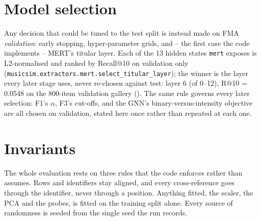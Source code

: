 \section{Model selection}
\label{sec:model-selection-protocol}

Any decision that could be tuned to the test split is instead made on FMA
\emph{validation}: early stopping, hyper-parameter grids, and -- the first
case the code implements -- MERT's titular layer. Each of the 13 hidden
states \texttt{mert} exposes is L2-normalised and ranked by Recall@10 on
validation only (\texttt{musicsim.extractors.mert.select\_titular\_layer});
the winner is the layer every later stage uses, never re-chosen against test:
layer 6 (of 0--12), R@10 = 0.0548 on the 800-item validation gallery
(). The same rule governs every later
selection: F1's $\alpha$, F3's cut-offs, and the GNN's binary-versus-intensity
objective are all chosen on validation, stated here once rather than repeated
at each one.

\section{Invariants}
\label{sec:invariants}

The whole evaluation rests on three rules that the code enforces rather than
assumes. Rows and identifiers stay aligned, and every cross-reference goes
through the identifier, never through a position. Anything fitted, the scaler,
the PCA and the probes, is fitted on the training split alone. Every source of
randomness is seeded from the single seed the run records.
